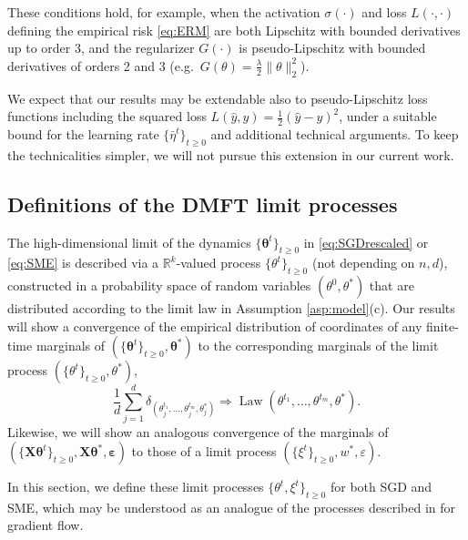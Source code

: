 \documentclass[11pt,letterpaper,reqno]{amsart}
\theoremstyle{definition}
\def\eps{\varepsilon}
\def\R{\mathbb{R}}
\def\Law{\operatorname{Law}}
\def\X{\mathbf{X}}
\def\beps{\boldsymbol{\varepsilon}}
\def\btheta{\boldsymbol{\theta}}
\begin{document}
These conditions hold, for example, when the activation
$\sigma(\cdot)$ and loss $L(\cdot,\cdot)$ defining the empirical risk
\eqref{eq:ERM} are both Lipschitz with
bounded derivatives up to order 3, and the regularizer $G(\cdot)$ is
pseudo-Lipschitz with bounded derivatives of orders 2 and 3
(e.g.\ $G(\theta)=\frac{\lambda}{2}\|\theta\|_2^2$).

We expect that our results may be extendable also to pseudo-Lipschitz loss
functions including the squared loss $L(\hat y,y)=\frac{1}{2}(\hat y-y)^2$,
under a suitable bound for the learning rate $\{\bar\eta^t\}_{t \geq 0}$
and additional technical arguments. To keep the technicalities simpler,
we will not pursue this extension in our current work.

\subsection{Definitions of the DMFT limit processes}\label{sec:DMFTlimits}

The high-dimensional limit of the dynamics $\{\btheta^t\}_{t \geq 0}$ in
\eqref{eq:SGDrescaled} or \eqref{eq:SME} is described via a
$\R^k$-valued process $\{\theta^t\}_{t \geq 0}$ (not depending on $n,d$),
constructed in a probability space of random variables $(\theta^0,\theta^*)$
that are distributed according to the limit law in Assumption
\ref{asp:model}(c). Our results will show a convergence of the empirical
distribution of coordinates of any finite-time marginals of
$(\{\btheta^t\}_{t \geq 0},\btheta^*)$ to the corresponding marginals of the
limit process
$(\{\theta^t\}_{t \geq 0},\theta^*)$,
\[\frac{1}{d}\sum_{j=1}^d
\delta_{(\theta_j^{t_1},\ldots,\theta_j^{t_m},\theta_j^*)}
\Rightarrow \Law(\theta^{t_1},\ldots,\theta^{t_m},\theta^*).\]
Likewise, we will show an analogous convergence of the marginals of $(\{\X\btheta^t\}_{t \geq 0},\X\btheta^*,\beps)$ to those of a limit process $(\{\xi^t\}_{t \geq 0},w^*,\eps)$.

In this section, we define these limit processes $\{\theta^t,\xi^t\}_{t \geq 0}$ for both
SGD and SME, which may be understood as an analogue of the processes described
in \cite{celentano2021high} for gradient flow.
\end{document}
